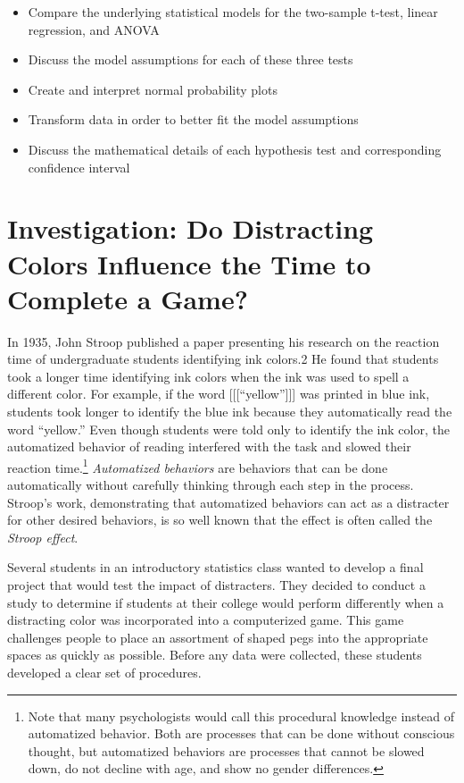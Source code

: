 \documentclass[
]{report}
\providecommand{\tightlist}{%
  \setlength{\itemsep}{0pt}\setlength{\parskip}{0pt}}
\theoremstyle{definition}
\theoremstyle{definition}
\theoremstyle{definition}
\theoremstyle{definition}
\theoremstyle{remark}
\begin{document}
\begin{itemize}
\tightlist
\item
  Compare the underlying statistical models for the two-sample t-test, linear regression, and
  ANOVA
\item
  Discuss the model assumptions for each of these three tests
\item
  Create and interpret normal probability plots
\item
  Transform data in order to better fit the model assumptions
\item
  Discuss the mathematical details of each hypothesis test and corresponding confidence interval
\end{itemize}

\newpage

\hypertarget{investigation-do-distracting-colors-influence-the-time-to-complete-a-game}{%
\section{Investigation: Do Distracting Colors Influence the Time to Complete a Game?}\label{investigation-do-distracting-colors-influence-the-time-to-complete-a-game}}

In 1935, John Stroop published a paper presenting his research on the reaction time of undergraduate students identifying ink colors.2 He found that students took a longer time identifying ink colors when the ink was used to spell a different color. For example, if the word {[}{[}{[}``yellow''{]}{]}{]} was printed in blue ink, students took longer to identify the blue ink because they automatically read the word ``yellow.'' Even though students were told only to identify the ink color, the automatized behavior of reading interfered with the task and slowed their reaction time.\footnote{Note that many psychologists would call this procedural knowledge instead of automatized behavior. Both are processes that can be done without conscious thought, but automatized behaviors are processes that cannot be slowed down, do not
  decline with age, and show no gender differences.} \emph{Automatized behaviors} are behaviors that can be done automatically without carefully thinking through each step in the process. Stroop's work, demonstrating that automatized behaviors can act as a distracter for other desired behaviors, is so well known that the effect is often called the \emph{Stroop effect}.

Several students in an introductory statistics class wanted to develop a final project that would test the impact of distracters. They decided to conduct a study to determine if students at their college would perform differently when a distracting color was incorporated into a computerized game. This game challenges people to place an assortment of shaped pegs into the appropriate spaces as quickly as possible. Before any data were collected, these students developed a clear set of procedures.
\end{document}
